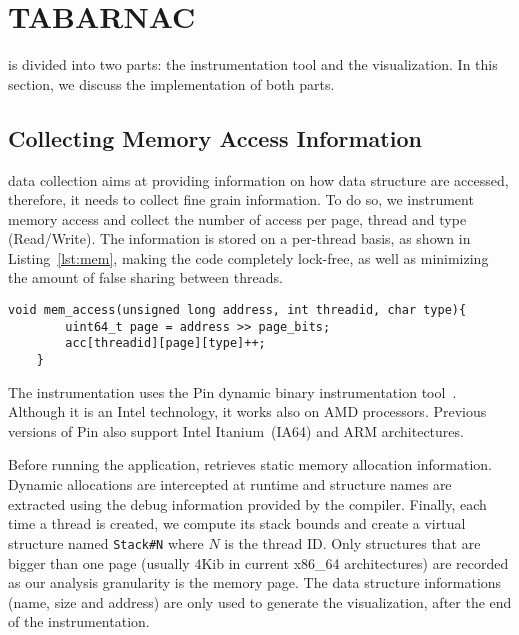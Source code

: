 
\section{TABARNAC}
\label{sec:design}

\TABARNAC is divided into two parts: the instrumentation tool and the
visualization. In this section, we discuss the implementation of both parts.

\subsection{Collecting Memory Access Information}
\label{sec:design-impl}

\TABARNAC data collection aims at providing information on how data structure
are accessed, therefore, it needs to collect fine grain information. To do so,
we instrument memory access and collect the number of access per page, thread
and type (Read/Write). The information is stored on a per-thread basis, as
shown in Listing~\ref{lst:mem}, making the code completely lock-free, as well
as minimizing the amount of false sharing between threads.

\begin{lstlisting}[caption={Code executed on each memory access. Pin provides the \texttt{address}, \texttt{threadid} and \texttt{type} parameters.},label=lst:mem]
	void mem_access(unsigned long address, int threadid, char type){
		uint64_t page = address >> page_bits;
		acc[threadid][page][type]++;
	}
\end{lstlisting}

The instrumentation uses the Pin dynamic binary instrumentation
tool~\cite{Luk05Pin}. Although it is an Intel technology, it works also on AMD
processors.
Previous versions of Pin also support Intel Itanium~(IA64) and ARM architectures.

Before running the application, \TABARNAC retrieves static memory allocation
information. %
Dynamic allocations are intercepted at runtime and structure names
are extracted using the debug information provided by the compiler.
Finally, each time a thread is created, we compute its
stack bounds and create a virtual structure named \texttt{Stack\#N} where
$N$ is the thread ID. Only structures that are bigger than one page (usually
$4$Kib in current x86\_64 architectures) are recorded as our
analysis granularity is the memory page. The data structure informations (name,
size and address) are only used to generate the visualization, after the end
of the instrumentation.

